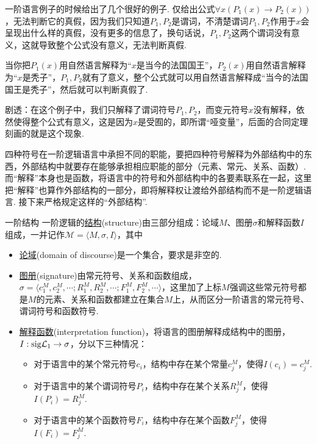 \begin{note}
    一阶语言例子的时候给出了几个很好的例子. 仅给出公式\(\forall x (P_1(x) \to P_2(x))\)，无法判断它的真假，因为我们只知道\(P_1,P_2\)是谓词，不清楚谓词\(P_1,P_2\)作用于\(x\)会呈现出什么样的真假，没有更多的信息了，换句话说，\(P_1,P_2\)这两个谓词没有意义，这就导致整个公式没有意义，无法判断真假. 

    当你把\(P_1(x)\)用自然语言解释为“\(x\)是当今的法国国王”，\(P_2(x)\)用自然语言解释为“\(x\)是秃子”，\(P_1,P_2\)就有了意义，整个公式就可以用自然语言解释成“当今的法国国王是秃子”，然后就可以判断真假了. 

    剧透：在这个例子中，我们只解释了谓词符号\(P_1, P_2\)，而变元符号\(x\)没有解释，依然使得整个公式有意义，这是因为\(x\)是受囿的，即所谓“哑变量”，后面的合同定理刻画的就是这个现象.
\end{note}

四种符号在一阶逻辑语言中承担不同的职能，要把四种符号解释为外部结构中的东西，外部结构中就要存在能够承担相应职能的部分（元素、常元、关系、函数）. 而“解释”本身也是函数，将语言中的符号和外部结构中的各要素联系在一起，这里把“解释”也算作外部结构的一部分，即将解释权让渡给外部结构而不是一阶逻辑语言. 接下来严格规定这样的“外部结构”.

\begin{definition}{一阶结构}
    一阶逻辑的\underline{结构}(structure)由三部分组成：论域\(M\)、图册\(\sigma\)和解释函数\(I\)组成，一并记作\(\mathcal{M} = \langle M, \sigma, I \rangle\)，其中
    \begin{itemize}
        \item \underline{论域}(domain of discourse)是一个集合，要求是非空的.
        \item \underline{图册}(signature)由常元符号、关系和函数组成，\(\sigma = \langle c_1^M, c_2^M, \cdots; R_1^M, R_2^M, \cdots; F_1^M, F_2^M, \cdots \rangle\)，这里加了上标\(M\)强调这些常元符号都是\(M\)的元素、关系和函数都建立在集合\(M\)上，从而区分一阶语言的常元符号、谓词符号和函数符号.
        \item \underline{解释函数}(interpretation function)，将语言的图册解释成结构中的图册，\(I: {\rm sig}\mathcal{L}_1 \to \sigma\)，分以下三种情况：
        \begin{itemize}
            \item 对于语言中的某个常元符号\(c_i\)，结构中存在某个常量\(c_j^M\)，使得\(I(c_i) = c_j^M\).
            \item 对于语言中的某个谓词符号\(P_i\)，结构中存在某个关系\(R_j^M\)，使得\(I(P_i) = R_j^M\).
            \item 对于语言中的某个函数符号\(F_i\)，结构中存在某个函数\(F_j^M\)，使得\(I(F_i) = F_j^M\).
        \end{itemize}
    \end{itemize}
\end{definition}

